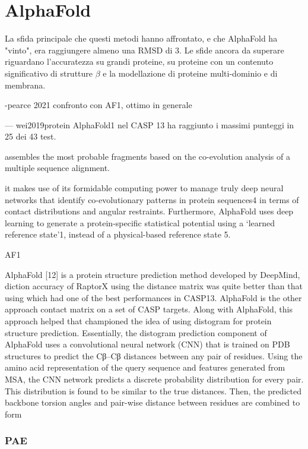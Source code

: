 \chapter{AlphaFold}

	\par La sfida principale che questi metodi hanno affrontato, e che AlphaFold ha "vinto", era raggiungere almeno una RMSD di 3\angstrom. Le sfide ancora da superare riguardano l'accuratezza su grandi proteine, su proteine con un contenuto significativo di strutture $\beta$ e la modellazione di proteine multi-dominio e di membrana.
	

-pearce 2021 confronto con AF1, ottimo in generale

--- wei2019protein
AlphaFold1 nel CASP 13 ha raggiunto i massimi punteggi in 25 dei 43 test.

assembles the most probable
fragments based on the co-evolution
analysis of a multiple sequence alignment.

it makes
use of its formidable computing power
to manage truly deep neural networks
that identify co-evolutionary patterns in
protein sequences4 in terms of contact
distributions and angular restraints.
Furthermore, AlphaFold uses deep
learning to generate a protein-specific
statistical potential using a ‘learned
reference state’1, instead of a physical-based
reference state 5.

AF1

AlphaFold  [12] is a protein structure  prediction  method  developed  by  DeepMind, diction  accuracy  of RaptorX  using  the distance  matrix  was quite better than  that using which  had  one  of  the  best  performances  in  CASP13.  AlphaFold  is  the  other  approach contact matrix on a set of CASP targets. Along with AlphaFold, this approach  helped that championed the idea of using distogram for protein structure prediction. Essentially, the distogram prediction component of AlphaFold uses a convolutional neural network (CNN) that is trained on PDB structures to predict the Cβ–Cβ distances between any pair of residues. Using the amino acid representation of the query sequence and features generated from MSA, the CNN network predicts a discrete probability distribution for every pair. This distribution is found to be similar to the true distances. Then, the predicted backbone torsion angles and pair-wise distance between residues are combined to form \supercite{pakhrin2021deep}

\subsection{PAE}

\clearpage